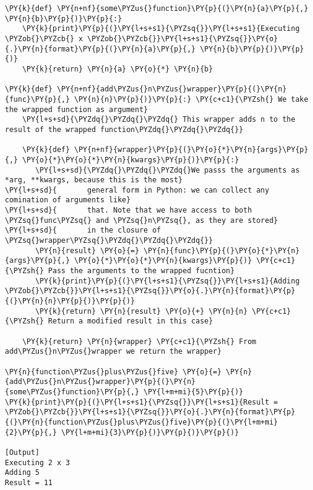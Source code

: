 \begin{Verbatim}[label=\makebox{\url{https://github.com/lucabaldini/cmepda/tree/master/slides/latex/snippets/wrapper.py}},commandchars=\\\{\}]
\PY{k}{def} \PY{n+nf}{some\PYZus{}function}\PY{p}{(}\PY{n}{a}\PY{p}{,} \PY{n}{b}\PY{p}{)}\PY{p}{:}
    \PY{k}{print}\PY{p}{(}\PY{l+s+s1}{\PYZsq{}}\PY{l+s+s1}{Executing \PYZob{}\PYZcb{} x \PYZob{}\PYZcb{}}\PY{l+s+s1}{\PYZsq{}}\PY{o}{.}\PY{n}{format}\PY{p}{(}\PY{n}{a}\PY{p}{,} \PY{n}{b}\PY{p}{)}\PY{p}{)}
    \PY{k}{return} \PY{n}{a} \PY{o}{*} \PY{n}{b}
    
\PY{k}{def} \PY{n+nf}{add\PYZus{}n\PYZus{}wrapper}\PY{p}{(}\PY{n}{func}\PY{p}{,} \PY{n}{n}\PY{p}{)}\PY{p}{:} \PY{c+c1}{\PYZsh{} We take the wrapped function as argument}
    \PY{l+s+sd}{\PYZdq{}\PYZdq{}\PYZdq{} This wrapper adds n to the result of the wrapped function\PYZdq{}\PYZdq{}\PYZdq{}}
    
    \PY{k}{def} \PY{n+nf}{wrapper}\PY{p}{(}\PY{o}{*}\PY{n}{args}\PY{p}{,} \PY{o}{*}\PY{o}{*}\PY{n}{kwargs}\PY{p}{)}\PY{p}{:} 
       \PY{l+s+sd}{\PYZdq{}\PYZdq{}\PYZdq{}We passs the arguments as *arg, **kwargs, because this is the most}
\PY{l+s+sd}{       general form in Python: we can collect any comination of arguments like}
\PY{l+s+sd}{       that. Note that we have access to both \PYZsq{}func\PYZsq{} and \PYZsq{}n\PYZsq{}, as they are stored}
\PY{l+s+sd}{       in the closure of \PYZsq{}wrapper\PYZsq{}\PYZdq{}\PYZdq{}\PYZdq{}}
       \PY{n}{result} \PY{o}{=} \PY{n}{func}\PY{p}{(}\PY{o}{*}\PY{n}{args}\PY{p}{,} \PY{o}{*}\PY{o}{*}\PY{n}{kwargs}\PY{p}{)} \PY{c+c1}{\PYZsh{} Pass the arguments to the wrapped fucntion}
       \PY{k}{print}\PY{p}{(}\PY{l+s+s1}{\PYZsq{}}\PY{l+s+s1}{Adding \PYZob{}\PYZcb{}}\PY{l+s+s1}{\PYZsq{}}\PY{o}{.}\PY{n}{format}\PY{p}{(}\PY{n}{n}\PY{p}{)}\PY{p}{)}
       \PY{k}{return} \PY{n}{result} \PY{o}{+} \PY{n}{n} \PY{c+c1}{\PYZsh{} Return a modified result in this case}
       
    \PY{k}{return} \PY{n}{wrapper} \PY{c+c1}{\PYZsh{} From add\PYZus{}n\PYZus{}wrapper we return the wrapper}

\PY{n}{function\PYZus{}plus\PYZus{}five} \PY{o}{=} \PY{n}{add\PYZus{}n\PYZus{}wrapper}\PY{p}{(}\PY{n}{some\PYZus{}function}\PY{p}{,} \PY{l+m+mi}{5}\PY{p}{)}
\PY{k}{print}\PY{p}{(}\PY{l+s+s1}{\PYZsq{}}\PY{l+s+s1}{Result = \PYZob{}\PYZcb{}}\PY{l+s+s1}{\PYZsq{}}\PY{o}{.}\PY{n}{format}\PY{p}{(}\PY{n}{function\PYZus{}plus\PYZus{}five}\PY{p}{(}\PY{l+m+mi}{2}\PY{p}{,} \PY{l+m+mi}{3}\PY{p}{)}\PY{p}{)}\PY{p}{)}

[Output]
Executing 2 x 3
Adding 5
Result = 11
\end{Verbatim}